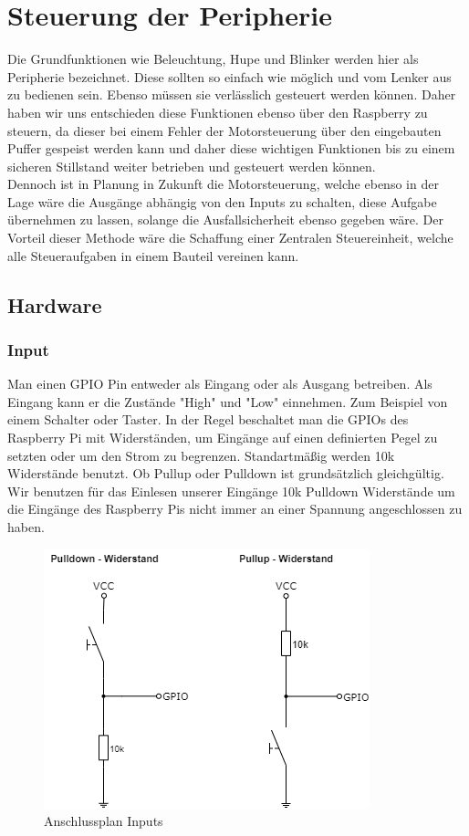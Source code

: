 \section{Steuerung der Peripherie}

Die Grundfunktionen wie Beleuchtung, Hupe und Blinker werden hier als Peripherie bezeichnet. Diese sollten so einfach wie möglich und vom Lenker aus zu bedienen sein. Ebenso müssen sie verlässlich gesteuert werden können. Daher haben wir uns entschieden diese Funktionen ebenso über den Raspberry zu steuern, da dieser bei einem Fehler der Motorsteuerung über den eingebauten Puffer gespeist werden kann und daher diese wichtigen Funktionen bis zu einem sicheren Stillstand weiter betrieben und gesteuert werden können.\\
Dennoch ist in Planung in Zukunft die Motorsteuerung, welche ebenso in der Lage wäre die Ausgänge abhängig von den Inputs zu schalten, diese Aufgabe übernehmen zu lassen, solange die Ausfallsicherheit ebenso gegeben wäre. Der Vorteil dieser Methode wäre die Schaffung einer Zentralen Steuereinheit, welche alle Steueraufgaben in einem Bauteil vereinen kann.

\subsection{Hardware}

\subsubsection{Input}

Man einen GPIO Pin entweder als Eingang oder als Ausgang betreiben. Als Eingang kann er die Zustände "High" und "Low" einnehmen. Zum Beispiel von einem Schalter oder Taster. In der Regel beschaltet man die GPIOs des Raspberry Pi mit Widerständen, um Eingänge auf einen definierten Pegel zu setzten oder um den Strom zu begrenzen. Standartmäßig werden 10k Widerstände benutzt. Ob Pullup oder Pulldown ist grundsätzlich gleichgültig. Wir benutzen für das Einlesen unserer Eingänge 10k Pulldown Widerstände um die Eingänge des Raspberry Pis nicht immer an einer Spannung angeschlossen zu haben.

\begin{figure}[H]
	\begin{center}
		\includegraphics[scale=0.8]{figures/hcis/input.png}
			\caption{Anschlussplan Inputs}
			\label{fig:input}
	\end{center}
\end{figure}

